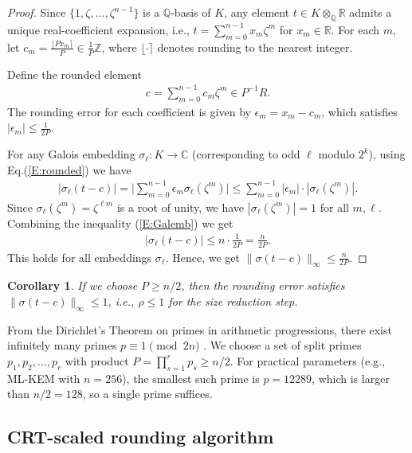\documentclass[11pt,a4paper]{article}
\theoremstyle{plain}
\newtheorem{corollary}[theorem]{Corollary}
\theoremstyle{definition}
\theoremstyle{remark}
\newcommand{\Z}{\mathbb{Z}}
\newcommand{\Q}{\mathbb{Q}}
\newcommand{\R}{\mathbb{R}}
\newcommand{\C}{\mathbb{C}}
\begin{document}
\begin{proof}
Since $\{1, \zeta, \dots, \zeta^{n-1}\}$ is a $\Q$-basis of $K$, any element $t \in K \otimes_\Q \R$ admits a unique real-coefficient expansion, i.e., $t=\sum_{m=0}^{n-1} x_m \zeta^m$ for $x_m \in \R$. For each $m$, let $c_m=\frac{\lfloor P x_m \rceil}{P} \in \frac{1}{P}\Z$, where $\lfloor \cdot \rceil$ denotes rounding to the nearest integer. 

Define the rounded element 
\begin{align}
c=\sum_{m=0}^{n-1} c_m \zeta^m \in P^{-1}R.
\label{E:rounded}
\end{align}
The rounding error for each coefficient is given by $\epsilon_m=x_m-c_m$, which satisfies $|\epsilon_m| \le \frac{1}{2P}$.

For any Galois embedding $\sigma_\ell: K \to \C$ (corresponding to odd $\ell$ modulo $2^k$), using Eq.(\ref{E:rounded}) we have
\begin{align}
|\sigma_\ell(t-c)|=\Big| \sum_{m=0}^{n-1} \epsilon_m \sigma_\ell(\zeta^m) \Big|
\le \sum_{m=0}^{n-1} |\epsilon_m| \cdot |\sigma_\ell(\zeta^m)|.
\label{E:Galemb}
\end{align}
Since $\sigma_\ell(\zeta^m)=\zeta^{\ell m}$ is a root of unity, we have $|\sigma_\ell(\zeta^m)|=1$ for all $m,\ell$. Combining the inequality (\ref{E:Galemb}) we get
\begin{align}
|\sigma_\ell(t-c)| \le n \cdot \frac{1}{2P}=\frac{n}{2P}.
\label{E:sigdiff}
\end{align}
This holds for all embeddings $\sigma_\ell$. Hence, we get $\|\sigma(t-c)\|_\infty \le \frac{n}{2P}$.
\end{proof}

\begin{corollary}\label{cor:rho1}
If we choose $P \ge n/2$, then the rounding error satisfies $\|\sigma(t-c)\|_\infty \le 1$, i.e., $\rho \le 1$ for the size reduction step.

\end{corollary}

From the Dirichlet's Theorem on primes in arithmetic progressions, there exist infinitely many primes $p \equiv 1 \pmod{2n}$ \cite{Wash97}. We choose a set of split primes $p_1, p_2, \dots, p_r$ with product $P=\prod_{s=1}^r p_s \ge n/2$. For practical parameters (e.g., ML-KEM with $n=256$), the smallest such prime is $p=12289$, which is larger than $n/2=128$, so a single prime suffices.

\subsection{CRT-scaled rounding algorithm}
\end{document}
